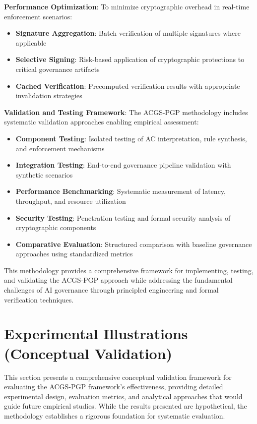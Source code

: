 \documentclass[sigconf,review,anonymous=false]{acmart} %
\begin{document}
\textbf{Performance Optimization}: To minimize cryptographic overhead in real-time enforcement scenarios:
\begin{itemize}
    \item \textbf{Signature Aggregation}: Batch verification of multiple signatures where applicable
    \item \textbf{Selective Signing}: Risk-based application of cryptographic protections to critical governance artifacts
    \item \textbf{Cached Verification}: Precomputed verification results with appropriate invalidation strategies
\end{itemize}

\textbf{Validation and Testing Framework}: The ACGS-PGP methodology includes systematic validation approaches enabling empirical assessment:
\begin{itemize}
    \item \textbf{Component Testing}: Isolated testing of AC interpretation, rule synthesis, and enforcement mechanisms
    \item \textbf{Integration Testing}: End-to-end governance pipeline validation with synthetic scenarios
    \item \textbf{Performance Benchmarking}: Systematic measurement of latency, throughput, and resource utilization
    \item \textbf{Security Testing}: Penetration testing and formal security analysis of cryptographic components
    \item \textbf{Comparative Evaluation}: Structured comparison with baseline governance approaches using standardized metrics
\end{itemize}

This methodology provides a comprehensive framework for implementing, testing, and validating the ACGS-PGP approach while addressing the fundamental challenges of AI governance through principled engineering and formal verification techniques.

\section{Experimental Illustrations (Conceptual Validation)}
\label{sec:experimental_illustrations}
This section presents a comprehensive conceptual validation framework for evaluating the ACGS-PGP framework's effectiveness, providing detailed experimental design, evaluation metrics, and analytical approaches that would guide future empirical studies. While the results presented are hypothetical, the methodology establishes a rigorous foundation for systematic evaluation.
\end{document}
